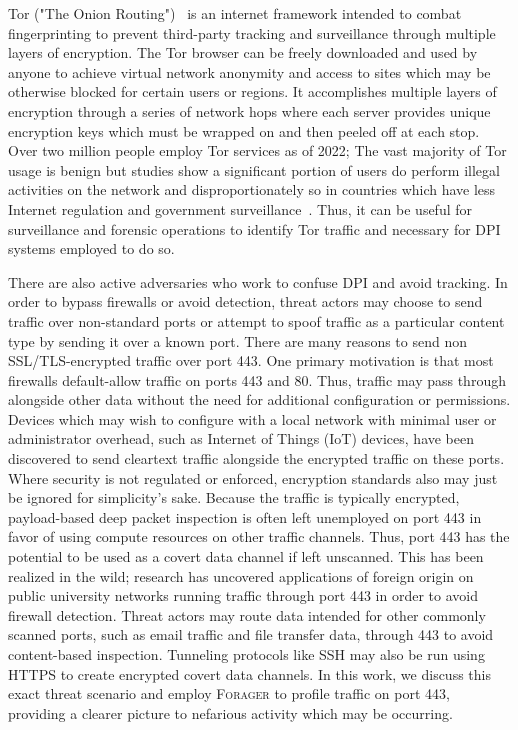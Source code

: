 Tor ("The Onion Routing")~\cite{tor} is an internet framework intended to combat fingerprinting to prevent third-party tracking and surveillance through multiple layers of encryption. The Tor browser can be freely downloaded and used by anyone to achieve virtual network anonymity and access to sites which may be otherwise blocked for certain users or regions. It accomplishes multiple layers of encryption through a series of network hops where each server provides unique encryption keys which must be wrapped on and then peeled off at each stop. Over two million people employ Tor services as of 2022; The vast majority of Tor usage is benign but studies show a significant portion of users do perform illegal activities on the network and disproportionately so in countries which have less Internet regulation and government surveillance~\cite{Jardine2020ThePH}. Thus, it can be useful for surveillance and forensic operations to identify Tor traffic and necessary for DPI systems employed to do so.

There are also active adversaries who work to confuse DPI and avoid tracking. In order to bypass firewalls or avoid detection, threat actors may choose to send traffic over non-standard ports or attempt to spoof traffic as a particular content type by sending it over a known port. There are many reasons to send non SSL/TLS-encrypted traffic over port 443. One primary motivation is that most firewalls default-allow traffic on ports 443 and 80. Thus, traffic may pass through alongside other data without the need for additional configuration or permissions. Devices which may wish to configure with a local network with minimal user or administrator overhead, such as Internet of Things (IoT) devices, have been discovered to send cleartext traffic alongside the encrypted traffic on these ports. Where security is not regulated or enforced, encryption standards also may just be ignored for simplicity's sake. Because the traffic is typically encrypted, payload-based deep packet inspection is often left unemployed on port 443 in favor of using compute resources on other traffic channels. Thus, port 443 has the potential to be used as a covert data channel if left unscanned. This has been realized in the wild; research has uncovered applications of foreign origin on public university networks running traffic through port 443 in order to avoid firewall detection. Threat actors may route data intended for other commonly scanned ports, such as email traffic and file transfer data, through 443 to avoid content-based inspection. Tunneling protocols like SSH may also be run using HTTPS to create encrypted covert data channels. In this work, we discuss this exact threat scenario and employ \textsc{Forager} to profile traffic on port 443, providing a clearer picture to nefarious activity which may be occurring.

